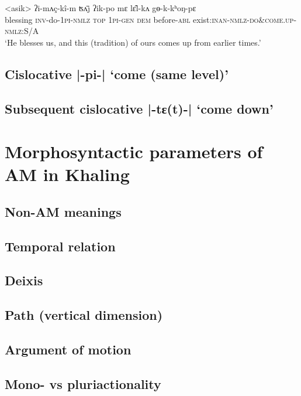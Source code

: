 \documentclass[oneside,a4paper,11pt]{article}
\newcommand{\ipa}[1]{{\phon#1}}
\newcommand{\dhatu}[2]{|\ipa{#1}| `#2'}
\begin{document}
\begin{exe}
\ex \label{ex:gyokkhongpya}
 \gll <asik> \ipa{ʔi-mʌç-kî-m} \ipa{ʦʌ̄j} \ipa{ʔik-po} \ipa{mɛ} \ipa{lɛ̂l-kʌ} \ipa{gɵ-k-kʰoŋ-pɛ} \\
blessing \textsc{inv}-do-\textsc{1pi}-\textsc{nmlz} \textsc{top} \textsc{1pi}-\textsc{gen} \textsc{dem} before-\textsc{abl} exist:\textsc{inan}-\textsc{nmlz}-\textsc{do\&come.up}-\textsc{nmlz}:S/A \\
\glt   `He blesses us, and this (tradition) of ours comes up from earlier times.'
\end{exe}

 

\subsection{Cislocative \dhatu{-pi-}{come (same level)}} \label{sec:v2.pi}
\subsection{Subsequent cislocative \dhatu{-tɛ(t)-}{come down}} \label{sec:v2.tya}

\section{Morphosyntactic parameters of AM in Khaling}

\subsection{Non-AM meanings} \label{sec:non.am}
\subsection{Temporal relation} \label{sec:temporal}
\subsection{Deixis} \label{sec:deixis}
\subsection{Path (vertical dimension)} \label{sec:vertical}
\subsection{Argument of motion} \label{sec:argument}
\subsection{Mono- vs pluriactionality} \label{sec:pluriactionality}
\end{document}
